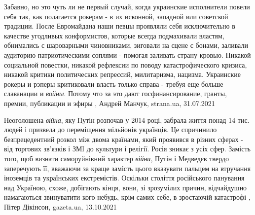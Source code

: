 Забавно, но это чуть ли не первый случай, когда украинские исполнители повели
себя так, как полагается рокерам - в их исконной, западной или советской
традиции. После Евромайдана наши певцы проявляли себя исключительно в качестве
угодливых конформистов, которые всегда подмахивали властям, обнимались с
шароварными чиновниками, зиговали на сцене с бонами, заливали аудиторию
патриотическими соплями - помогая заливать страну кровью.  Никакой социальной
повестки, никакой рефлексии по поводу катастрофического кризиса, никакой
критики политических репрессий, милитаризма, нацизма. Украинские рокеры и
рэперы критиковали власть только справа - требуя еще больше славанации и \emph{войны}.
Потому что за это дают госфинансирование, гранты, премии, публикации и эфиры
, Андрей Манчук, strana.ua, 31.07.2021

Неоголошена \emph{війна}, яку Путін розпочав у 2014 році, забрала життя понад 14 тис.
людей і призвела до переміщення мільйонів українців. Це спричинило
безпрецедентний розкол між двома країнами, який проявився в різних сферах - від
торгових зв'язків і ЗМІ до культури і релігії. Росія зникає з усіх сфер.
Замість того, щоб визнати саморуйнівний характер \emph{війни}, Путін і Медведєв твердо
заперечують її, вважаючи за краще замість цього вказувати пальцем на втручання
іноземців та українських екстремістів. Оскільки століття російського панування
над Україною, схоже, добігають кінця, вони, зі зрозумілих причин, відчайдушно
намагаються звинуватити кого-небудь, крім самих себе, в зростаючій катастрофі
, 
Пітер Дікінсон, gazeta.ua, 13.10.2021
